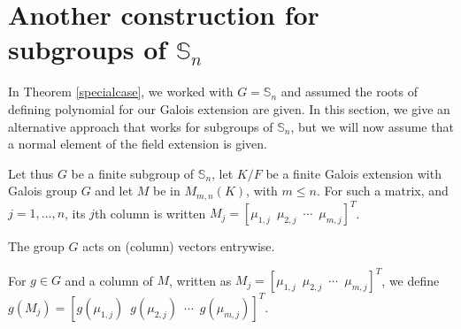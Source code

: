 \documentclass[12pt]{article}
\theoremstyle{plain}
\begin{document}
\section{Another construction for subgroups of $\mathbb{S}_n$}

In Theorem \ref{specialcase}, we worked with $G=\mathbb{S}_n$ and
assumed the roots of defining polynomial for our Galois extension are
given.  In this section, we give an alternative approach that works
for subgroups of $\mathbb{S}_n$, but we will now assume that a normal
element of the field extension is given.

Let thus $G$ be a finite subgroup of $\mathbb{S}_n$, let $K/F$ be a
finite Galois extension with Galois group $G$ and let $M$ be in
$M_{m,n}(K)$, with $m \leq n$. For such a matrix, and $j=1,\dots,n$,
its $j$th column is written $M_j=\left[\mu_{1,j} \,\,\, \mu_{2,j}
  \,\,\, \cdots \,\,\, \mu_{m,j}\right]^T$. 

The group $G$ acts on (column) vectors entrywise.

For $g \in G$ and a column
of $M$, written as $M_j = \left[\mu_{1,j} \,\,\, \mu_{2,j} \,\,\,
  \cdots \,\,\, \mu_{m,j}\right]^T$, we define $g(M_j) =
\left[g(\mu_{1,j}) \,\,\, g(\mu_{2,j}) \,\,\, \cdots \,\,\,
  g(\mu_{m,j})\right]^T$.
\end{document}
